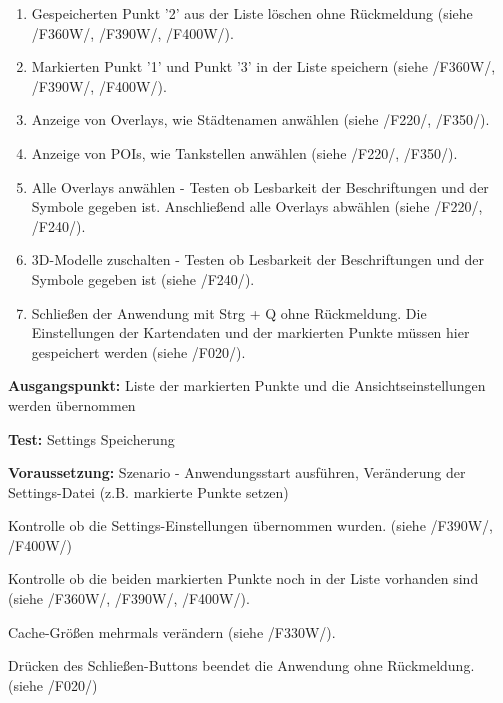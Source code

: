 \documentclass[10pt]{scrreprt}
\newenvironment{details}[1][6pt]{%
  \parskip#1 \parindent6mm \raggedright%
  \def\item{\par\ignorespaces\hangindent=5mm \hangafter1}}{%
  \par\ignorespaces}
\newcommand{\sfbf}[1]{\textbf{\sffamily #1}}
\newcommand{\ziel}[1]{{\fontsize{9.5}{11}\textsf{/#1/}}}
\newcommand{\ziellabel}{Z}
\newcommand{\muss}{\renewcommand{\labelenumi}{\textbf{\ziel{\ziellabel\numprint{\theenumi}0}}}}
\newcommand{\wunsch}{\renewcommand{\labelenumi}{\textbf{\ziel{\ziellabel\numprint{\theenumi}0W}}}}
\begin{document}
\begin{enumerate}[leftmargin = 2.2cm, resume]
\item Gespeicherten Punkt '2' aus der Liste löschen ohne Rückmeldung (siehe \ziel{F360W}, \ziel{F390W}, \ziel{F400W}).
\item Markierten Punkt '1' und Punkt '3' in der Liste speichern (siehe \ziel{F360W}, \ziel{F390W}, \ziel{F400W}).
\muss
\item Anzeige von Overlays, wie Städtenamen anwählen (siehe \ziel{F220}, \ziel{F350}).
\item Anzeige von POIs, wie Tankstellen anwählen (siehe \ziel{F220}, \ziel{F350}).
\item Alle Overlays anwählen - Testen ob Lesbarkeit der Beschriftungen und der Symbole gegeben ist. Anschließend alle Overlays abwählen (siehe \ziel{F220}, \ziel{F240}).
\item 3D-Modelle zuschalten - Testen ob Lesbarkeit der Beschriftungen und der Symbole gegeben ist (siehe \ziel{F240}).
\item  Schließen der Anwendung mit Strg + Q ohne Rückmeldung. Die Einstellungen der Kartendaten und der markierten Punkte müssen hier gespeichert werden (siehe \ziel{F020}).
\end{enumerate}

\vspace{1.0cm}
\begin{details}[2pt]
\item \sfbf{Ausgangspunkt:} Liste der markierten Punkte und die Ansichtseinstellungen werden übernommen
\item \sfbf{Test:} Settings Speicherung
\item \sfbf{Voraussetzung:} Szenario - Anwendungsstart ausführen, Veränderung der Settings-Datei (z.B. markierte Punkte setzen)
\end{details}
\vspace{2mm}
\begin{enumerate}[leftmargin = 2.2cm, resume]
\wunsch
\item Kontrolle ob die Settings-Einstellungen übernommen wurden. (siehe \ziel{F390W}, \ziel{F400W})
\item Kontrolle ob die beiden markierten Punkte noch in der Liste vorhanden sind (siehe \ziel{F360W}, \ziel{F390W}, \ziel{F400W}).
\item Cache-Größen mehrmals verändern (siehe \ziel{F330W}).
\muss
\item Drücken des Schließen-Buttons beendet die Anwendung ohne Rückmeldung. (siehe \ziel{F020})
\end{enumerate}
\end{document}

